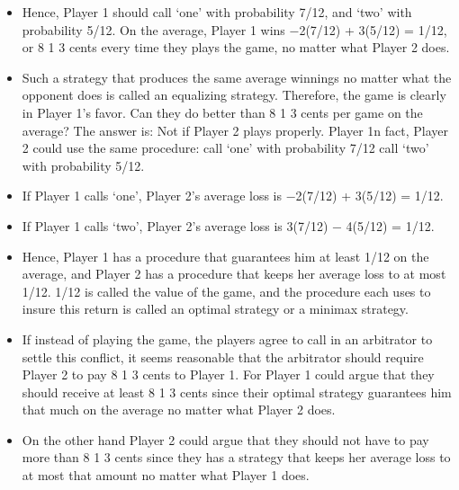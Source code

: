 \documentclass[]{report}
\begin{document}
\begin{itemize}
\item Hence, Player 1 should call ‘one’ with probability 7/12, and ‘two’ with probability 5/12. On the
average, Player 1 wins −2(7/12) + 3(5/12) = 1/12, or 8 1
3 cents every time they plays the game, no
matter what Player 2 does. 
\item Such a strategy that produces the same average winnings no matter
what the opponent does is called an equalizing strategy.
Therefore, the game is clearly in Player 1’s favor. Can they do better than 8 1
3 cents per game
on the average? The answer is: Not if Player 2 plays properly. Player 1n fact, Player 2 could use the same
procedure:
call ‘one’ with probability 7/12
call ‘two’ with probability 5/12.
\item If Player 1 calls ‘one’, Player 2’s average loss is −2(7/12) + 3(5/12) = 1/12. 
\item If Player 1 calls ‘two’, Player 2’s average
loss is 3(7/12) − 4(5/12) = 1/12.
\item Hence, Player 1 has a procedure that guarantees him at least 1/12 on the average, and Player 2 has
a procedure that keeps her average loss to at most 1/12. 1/12 is called the value of the
game, and the procedure each uses to insure this return is called an optimal strategy or
a minimax strategy.
\item If instead of playing the game, the players agree to call in an arbitrator to settle this
conflict, it seems reasonable that the arbitrator should require Player 2 to pay 8 1
3 cents to Player 1. For
Player 1 could argue that they should receive at least 8 1
3 cents since their optimal strategy guarantees
him that much on the average no matter what Player 2 does. 
\item On the other hand Player 2 could argue
that they should not have to pay more than 8 1
3 cents since they has a strategy that keeps
her average loss to at most that amount no matter what Player 1 does.
\end{itemize}
\end{document}
